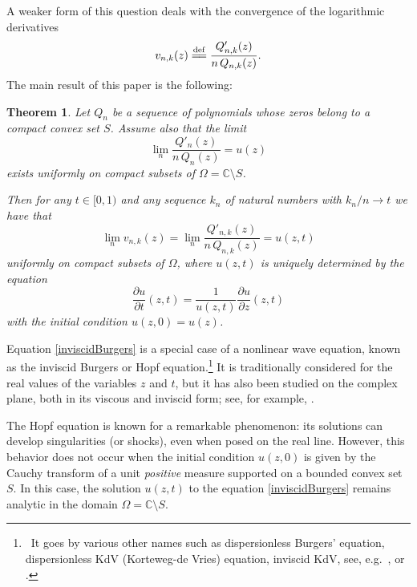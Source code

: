 \documentclass[reqno,11pt]{amsart}
\theoremstyle{plain}
\newtheorem{thm}{Theorem}[section]
\theoremstyle{definition}
\theoremstyle{remark}
\numberwithin{equation}{section}
\numberwithin{equation}{section}
\newcommand{\C}{\mathbb{C}}
\newcommand{\isdef}{\overset{\mathrm{def}}{=\joinrel=}}
\begin{document}
A weaker form of this question deals with the convergence of the logarithmic derivatives
\begin{equation} \label{eqCauchyTransf00}
v_{n,k} (z)\isdef	 \frac{  Q'_{n,k}(z)}{n\, Q_{n,k}(z)}  .
\end{equation}
The main result of this paper is the following:
\begin{thm} \label{mainthm0}
 Let $Q_n$ be a sequence of polynomials whose zeros belong to a compact convex set $S$.  Assume also that the limit 
 $$
 \lim_n  \frac{  Q'_{n}(z)}{n\, Q_{n}(z)} = u(z)
 $$
exists uniformly on compact subsets of $\Omega= \C\setminus S$. 

Then for any $t \in[0,1)$ and any sequence $k_n$ of natural numbers with $k_n / n \rightarrow t$ we have that
	\begin{equation}
	    \label{limitLogDervs}
	\lim_n  v_{n,k} (z)=\lim_n 	 \frac{  Q'_{n,k}(z)}{n\, Q_{n,k}(z)} =u(z,t)
	\end{equation}
uniformly on compact subsets of $\Omega$, where $u(z,t)$ is uniquely determined by the equation 
\begin{equation}
    \label{inviscidBurgers}
\frac{\partial u}{\partial t}(z, t)=\frac{1}{u(z, t)} \frac{\partial u}{\partial z}(z, t)
\end{equation}
with the initial condition $u(z,0)=u(z)$. 
\end{thm}
Equation \eqref{inviscidBurgers} is a special case of a nonlinear wave equation, known as the inviscid Burgers or Hopf equation.\footnote{\, It goes by various other names such as dispersionless Burgers' equation,  dispersionless KdV (Korteweg-de Vries) equation, inviscid KdV, see, e.g.~\cite[Section 2.1.3]{Arendt2023}, \cite[Section 3.4]{MR1625845} or \cite[Ch. 9]{MR2309862}.} It is traditionally considered for the real values of the variables $z$ and $t$, but it has also been studied on the complex plane, both in its viscous and inviscid form; see, for example, \cite{MR3573689, kabluchko2023fractional, kabluchko2023heat, MR3773856, MR4259446, VANDENHEUVEL2023133686}. 

The Hopf equation is known for a remarkable phenomenon: its solutions can develop singularities (or shocks), even when posed on the real line. However, this behavior does not occur when the initial condition $u(z,0)$ is given by the Cauchy transform of a unit \textit{positive} measure supported on a bounded convex set $S$. In this case, the solution $u(z,t)$ to the equation \eqref{inviscidBurgers} remains analytic in the domain $\Omega = \C \setminus S$.
	
\end{document}
